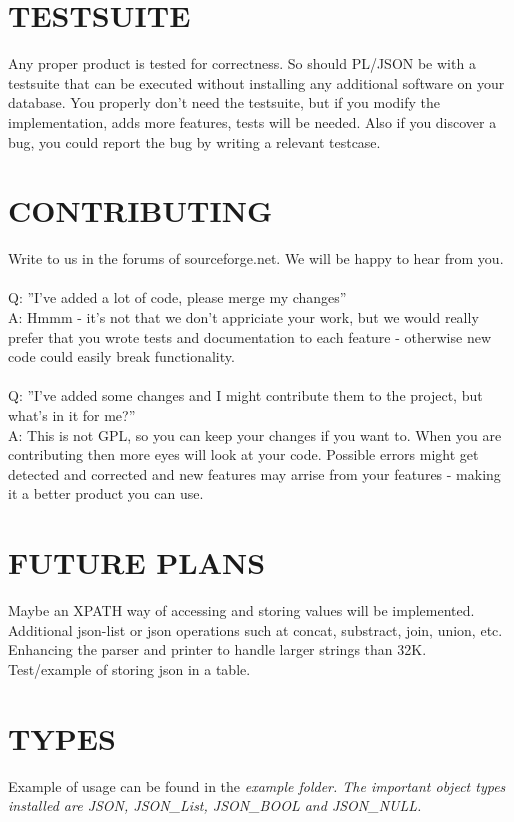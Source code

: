\documentclass[11pt,twocolumn, a4paper]{article}
\begin{document}
\section*{TESTSUITE}
Any proper product is tested for correctness. So should PL/JSON be with a testsuite that can be executed without installing any additional software on your database. You properly don't need the testsuite, but if you modify the implementation, adds more features, tests will be needed. Also if you discover a bug, you could report the bug by writing a relevant testcase.

\section*{CONTRIBUTING}
Write to us in the forums of sourceforge.net. We will be happy to hear from you. \\\\
Q: ''I've added a lot of code, please merge my changes''\\
A: Hmmm - it's not that we don't appriciate your work, but we would really prefer that you wrote tests and documentation to each feature - otherwise new code could easily break functionality. \\\\
Q: ''I've added some changes and I might contribute them to the project, but what's in it for me?''\\
A: This is not GPL, so you can keep your changes if you want to. 
When you are contributing then more eyes will look at your code. 
Possible errors might get detected and corrected and new features may arrise from your features - making it a better product you can use.

\section*{FUTURE PLANS}
Maybe an XPATH way of accessing and storing values will be implemented.\\
Additional json-list or json operations such at concat, substract, join, union, etc.\\
Enhancing the parser and printer to handle larger strings than 32K.\\
Test/example of storing json in a table.\\


\onecolumn
\section*{TYPES}
Example of usage can be found in the \em example \em folder. The important object types installed are JSON, JSON\_List, JSON\_BOOL and JSON\_NULL.
\end{document}
